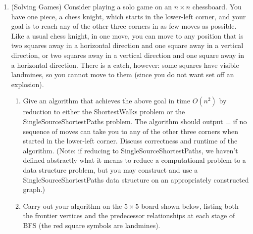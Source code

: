 \documentclass[11pt]{article}
\begin{document}
\begin{enumerate}
   \item  (Solving Games)
     Consider playing a solo game on an $n\times n$ chessboard.  You have one piece, a chess knight, which starts in the lower-left corner, and your goal is to reach any of the other three corners in as few moves as possible.  Like a usual chess knight, in one move, you can move to any position that is two squares away in a horizontal direction and one square away in a vertical direction, or two squares away in a vertical direction and one square away in a horizontal direction.  There is a catch, however: some squares have visible landmines, so you cannot move to them (since you do not want set off an explosion). \
    \begin{enumerate}
    \item
    Give an algorithm that achieves the above goal in time $O(n^2)$ by reduction to either the ShortestWalks problem or the SingleSourceShortestPaths problem. The algorithm should output $\bot$ if no sequence of moves can take you to any of the other three corners when started in the lower-left corner. Discuss correctness and runtime of the algorithm. (Note: if reducing to SingleSourceShortestPaths, we haven't defined abstractly what it means to reduce a computational problem to a data structure problem, but you may construct and use a SingleSourceShortestPaths data structure on an appropriately constructed graph.)

    \item Carry out your algorithm on the $5\times 5$ board shown below, listing both the frontier vertices and the predecessor relationships at each stage of BFS (the red square symbols are landmines).
    \begin{figure} [H]
    \centering
\end{figure}
\end{enumerate}
\end{enumerate}
\end{document}
